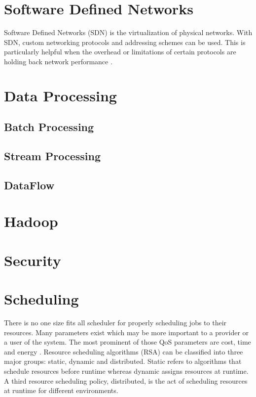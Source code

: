 \documentclass[fullapage,12pt]{article}
\begin{document}
\section{Software Defined Networks} \label{sec:sdn}

Software Defined Networks (SDN) is the virtualization of physical networks. With SDN, custom networking protocols and addressing schemes can be used. This is particularly helpful when the overhead or limitations of certain protocols are holding back network performance \cite{Jennings2015}.

\section{Data Processing} \label{sec:data-processing}


\subsection{Batch Processing} \label{sub:batch}


\subsection{Stream Processing} \label{sub:stream}

\subsection{DataFlow} \label{sub:dataflow}

\section{Hadoop} \label{sec:hadoop}

\section{Security} \label{sec:security}

\cite{liu2015survey}

\section{Scheduling} \label{sec:scheduling}

There is no one size fits all scheduler for properly scheduling jobs to their resources. Many parameters exist which may be more important to a provider or a user of the system. The most prominent of those QoS parameters are cost, time and energy \cite{Singh2016}. Resource scheduling algorithms (RSA) can be classified into three major groups: static, dynamic and distributed. Static refers to algorithms that schedule resources before runtime whereas dynamic assigns resources at runtime. A third resource scheduling policy, distributed, is the act of scheduling resources at runtime for different environments.
\end{document}
